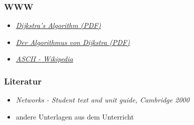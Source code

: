 \documentclass[a4paper,titlepage]{article}
\begin{document}
\subsubsection{WWW}

\begin{itemize}
\item \emph{\href{http://ocw.mit.edu/NR/rdonlyres/Sloan-School-of-Management/15-082JNetwork-OptimizationSpring2003/FC13EFA1-0FE2-4BFB-B019-8939606EDDCC/0/dijkstrasalgorithm.pdf}{Dijkstra’s Algorithm (PDF)}}
\item \emph{\href{http://www.educ.ethz.ch/lehrpersonen/informatik/unterrichtsmaterialien_inf/kommuniation_kryptographie/routing/la3.pdf}{Der Algorithmus von Dijkstra (PDF)}}
\item \emph{\href{http://en.wikipedia.org/wiki/ASCII}{ASCII - Wikipedia}}
\end{itemize}

\subsubsection{Literatur}
\begin{itemize}
\item \emph{Networks - Student text and unit guide, Cambridge 2000}
\item andere Unterlagen aus dem Unterricht
\end{itemize}
\end{document}
